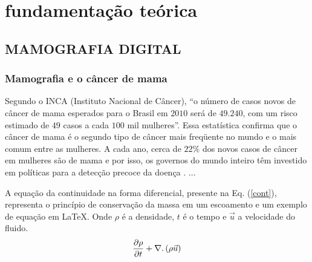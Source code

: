 \chapter[FUNDAMENTAÇÃO TEÓRICA]{\textbf {fundamentação teórica}}
\section[MAMOGRAFIA DIGITAL]{MAMOGRAFIA DIGITAL}
\subsection[Mamografia e o câncer de mama]{\textbf{Mamografia e o câncer de mama}}

Segundo o INCA (Instituto Nacional de Câncer), “o número de casos novos de câncer de
mama esperados para o Brasil em $2010$ será de $49.240$, com um risco estimado de $49$ casos
a cada $100$ mil mulheres”. Essa estatística confirma que o câncer de mama é o segundo
tipo de câncer mais freqüente no mundo e o mais comum entre as mulheres. A cada ano,
cerca de $22\%$ dos novos casos de câncer em mulheres são de mama e por isso, os governos
do mundo inteiro têm investido em políticas para a detecção precoce da doença \cite{inca}. $\ldots$

A equação da continuidade na forma diferencial, presente na Eq. (\ref{cont}), representa o
princípio de conservação da massa em um escoamento e um exemplo de equação em LaTeX.
Onde $\rho$ é a densidade, $t$ é o tempo e $\vec{u}$ a velocidade do fluido.
\begin{equation}
\label{cont}
\frac{\partial \rho}{\partial t} + \nabla \ldotp (\rho \vec{u}) 
\end{equation}